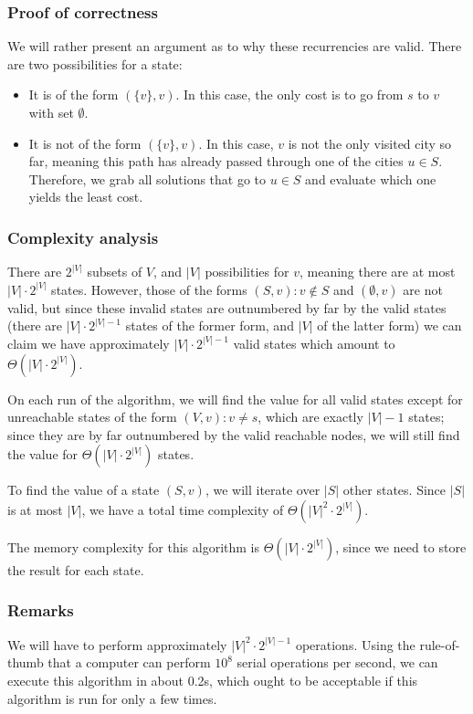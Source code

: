 \subsubsection{Proof of correctness}
We will rather present an argument as to why these recurrencies are valid. There are two possibilities for a state:
\begin{itemize}
    \item It is of the form $(\{v\}, v)$. In this case, the only cost is to go from $s$ to $v$ with set $\emptyset$.
    \item It is not of the form $(\{v\}, v)$. In this case, $v$ is not the only visited city so far, meaning this path has already passed through one of the cities $u \in S$. Therefore, we grab all solutions that go to $u \in S$ and evaluate which one yields the least cost.
\end{itemize}
\subsubsection{Complexity analysis}
There are $2^{|V|}$ subsets of $V$, and $|V|$ possibilities for $v$, meaning there are at most $|V| \cdot 2^{|V|}$ states. However, those of the forms $(S, v)\colon v \not \in S$ and $(\emptyset, v)$ are not valid, but since these invalid states are outnumbered by far by the valid states (there are $|V|\cdot 2^{|V|-1}$ states of the former form, and $|V|$ of the latter form) we can claim we have approximately $|V|\cdot 2^{|V|-1}$ valid states which amount to $\Theta(|V|\cdot 2^{|V|})$.\par
On each run of the algorithm, we will find the value for all valid states except for unreachable states of the form $(V, v)\colon v \neq s$, which are exactly $|V|-1$ states; since they are by far outnumbered by the valid reachable nodes, we will still find the value for $\Theta(|V|\cdot 2^{|V|})$ states.\par
To find the value of a state $(S,v)$, we will iterate over $|S|$ other states. Since $|S|$ is at most $|V|$, we have a total time complexity of $\Theta (|V|^2 \cdot 2^{|V|})$.\par
The memory complexity for this algorithm is $\Theta (|V| \cdot 2^{|V|})$, since we need to store the result for each state.
\subsubsection{Remarks}
We will have to perform approximately $|V|^2\cdot 2^{|V|-1}$ operations. Using the rule-of-thumb that a computer can perform $10^8$ serial operations per second, we can execute this algorithm in about 0.2s, which ought to be acceptable if this algorithm is run for only a few times.
